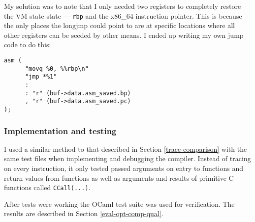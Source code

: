 My solution was to note that I only needed two registers to completely restore the VM state
state --- \texttt{rbp} and the x86\_64 instruction pointer. This is because the only places the
longjmp could point to are at specific locations where all other registers can be seeded by other
means. I ended up writing my own jump code to do this:

\begin{verbatim}
asm (
      "movq %0, %%rbp\n"
      "jmp *%1"
      :
      : "r" (buf->data.asm_saved.bp)
      , "r" (buf->data.asm_saved.pc)
);
\end{verbatim}

\subsubsection{Implementation and testing}

I used a similar method to that described in Section \ref{trace-comparison} with the same test
files
when implementing and debugging the compiler. Instead of tracing on every instruction, it only
tested
passed arguments on entry to functions and return values from functions as well as arguments and
results of
primitive C functions called \texttt{CCall(...)}.

After tests were working the OCaml test suite was used for verification. The results are described
in Section
\ref{eval-opt-comp-qual}.

